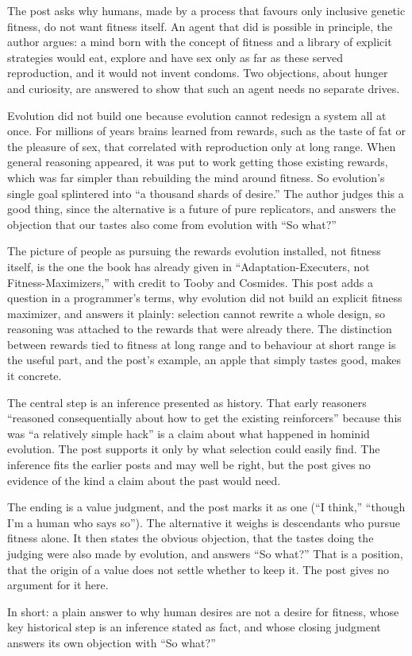 \begin{afterword}
\summaryhead

The post asks why humans, made by a process that favours only inclusive genetic fitness, do not want fitness itself. An agent that did is possible in principle, the author argues: a mind born with the concept of fitness and a library of explicit strategies would eat, explore and have sex only as far as these served reproduction, and it would not invent condoms. Two objections, about hunger and curiosity, are answered to show that such an agent needs no separate drives.

Evolution did not build one because evolution cannot redesign a system all at once. For millions of years brains learned from rewards, such as the taste of fat or the pleasure of sex, that correlated with reproduction only at long range. When general reasoning appeared, it was put to work getting those existing rewards, which was far simpler than rebuilding the mind around fitness. So evolution's single goal splintered into ``a thousand shards of desire.'' The author judges this a good thing, since the alternative is a future of pure replicators, and answers the objection that our tastes also come from evolution with ``So what?''

\responsehead

The picture of people as pursuing the rewards evolution installed, not fitness itself, is the one the book has already given in ``Adaptation-Executers, not Fitness-Maximizers,'' with credit to Tooby and Cosmides. This post adds a question in a programmer's terms, why evolution did not build an explicit fitness maximizer, and answers it plainly: selection cannot rewrite a whole design, so reasoning was attached to the rewards that were already there. The distinction between rewards tied to fitness at long range and to behaviour at short range is the useful part, and the post's example, an apple that simply tastes good, makes it concrete.

The central step is an inference presented as history. That early reasoners ``reasoned consequentially about how to get the existing reinforcers'' because this was ``a relatively simple hack'' is a claim about what happened in hominid evolution. The post supports it only by what selection could easily find. The inference fits the earlier posts and may well be right, but the post gives no evidence of the kind a claim about the past would need.

The ending is a value judgment, and the post marks it as one (``I think,'' ``though I'm a human who says so''). The alternative it weighs is descendants who pursue fitness alone. It then states the obvious objection, that the tastes doing the judging were also made by evolution, and answers ``So what?'' That is a position, that the origin of a value does not settle whether to keep it. The post gives no argument for it here.

In short: a plain answer to why human desires are not a desire for fitness, whose key historical step is an inference stated as fact, and whose closing judgment answers its own objection with ``So what?''
\end{afterword}
